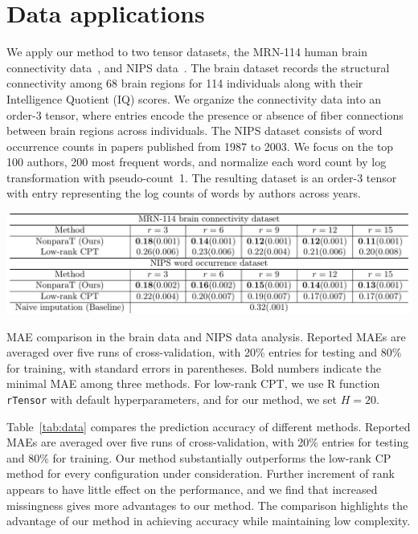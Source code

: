 \documentclass[useAMS,usenatbib,usegraphicx,referee]{biom}
\theoremstyle{plain}
\theoremstyle{definition}
\begin{document}
\section{Data applications}
We apply our method to two tensor datasets, the MRN-114 human brain connectivity data~\citep{wang2017bayesian}, and NIPS data~\citep{globerson2007euclidean}. The brain dataset records the structural connectivity among 68 brain regions for 114 individuals along with their Intelligence Quotient (IQ) scores. We organize the connectivity data into an order-3 tensor, where entries encode the presence or absence of fiber connections between brain regions across individuals. The NIPS dataset consists of word occurrence counts in papers published from 1987 to 2003. We focus on the top 100 authors, 200 most frequent words, and normalize each word count by log transformation with pseudo-count~1. The resulting dataset is an order-3 tensor with entry representing the log counts of words by authors across years. 





\begin{table}[h!]
\centering
\includegraphics[width = \textwidth]{figure/table.pdf}
 \captionsetup{justification=raggedright,font=small}
\caption{MAE comparison in the brain data and NIPS data analysis. Reported MAEs are averaged over five runs of cross-validation, with 20\% entries for testing and 80\% for training, with standard errors in parentheses. Bold numbers indicate the minimal MAE among three methods. For low-rank CPT, we use R function {\tt rTensor} with default hyperparameters, and for our method, we set $H=20$.}\label{tab:data}
\end{table}
\vspace{-.4cm}

Table~\ref{tab:data} compares the prediction accuracy of different methods. Reported MAEs are averaged over five runs of cross-validation, with 20\% entries for testing and 80\% for training. Our method substantially outperforms the low-rank CP method for every configuration under consideration. Further increment of rank appears to have little effect on the performance, and we find that increased missingness gives more advantages to our method. The comparison highlights the advantage of our method in achieving accuracy while maintaining low complexity. 
\end{document}
